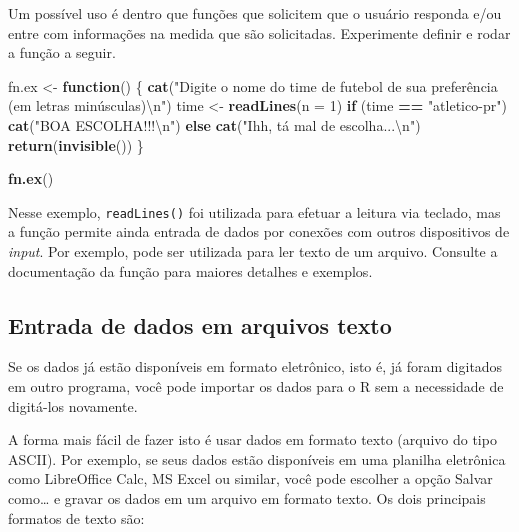 \documentclass[10pt,a4paper]{book}
\newenvironment{Shaded}{\begin{snugshade}}{\end{snugshade}}
\newcommand{\KeywordTok}[1]{\textcolor[rgb]{0.13,0.29,0.53}{\textbf{#1}}}
\newcommand{\DataTypeTok}[1]{\textcolor[rgb]{0.13,0.29,0.53}{#1}}
\newcommand{\DecValTok}[1]{\textcolor[rgb]{0.00,0.00,0.81}{#1}}
\newcommand{\CharTok}[1]{\textcolor[rgb]{0.31,0.60,0.02}{#1}}
\newcommand{\StringTok}[1]{\textcolor[rgb]{0.31,0.60,0.02}{#1}}
\newcommand{\ControlFlowTok}[1]{\textcolor[rgb]{0.13,0.29,0.53}{\textbf{#1}}}
\newcommand{\OperatorTok}[1]{\textcolor[rgb]{0.81,0.36,0.00}{\textbf{#1}}}
\newcommand{\NormalTok}[1]{#1}
\begin{document}
Um possível uso é dentro que funções que solicitem que o usuário
responda e/ou entre com informações na medida que são solicitadas.
Experimente definir e rodar a função a seguir.

\begin{Shaded}
\begin{Highlighting}[]
\NormalTok{fn.ex <-}\StringTok{ }\ControlFlowTok{function}\NormalTok{() \{}
    \KeywordTok{cat}\NormalTok{(}\StringTok{"Digite o nome do time de futebol de sua preferência (em letras minúsculas)}\CharTok{\textbackslash{}n}\StringTok{"}\NormalTok{)}
\NormalTok{    time <-}\StringTok{ }\KeywordTok{readLines}\NormalTok{(}\DataTypeTok{n =} \DecValTok{1}\NormalTok{)}
    \ControlFlowTok{if}\NormalTok{ (time }\OperatorTok{==}\StringTok{ "atletico-pr"}\NormalTok{)}
        \KeywordTok{cat}\NormalTok{(}\StringTok{"BOA ESCOLHA!!!}\CharTok{\textbackslash{}n}\StringTok{"}\NormalTok{)}
    \ControlFlowTok{else} \KeywordTok{cat}\NormalTok{(}\StringTok{"Ihh, tá mal de escolha...}\CharTok{\textbackslash{}n}\StringTok{"}\NormalTok{)}
    \KeywordTok{return}\NormalTok{(}\KeywordTok{invisible}\NormalTok{())}
\NormalTok{\}}
\end{Highlighting}
\end{Shaded}

\begin{Shaded}
\begin{Highlighting}[]
\KeywordTok{fn.ex}\NormalTok{()}
\end{Highlighting}
\end{Shaded}

Nesse exemplo, \texttt{readLines()} foi utilizada para efetuar a leitura
via teclado, mas a função permite ainda entrada de dados por conexões
com outros dispositivos de \emph{input}. Por exemplo, pode ser utilizada
para ler texto de um arquivo. Consulte a documentação da função para
maiores detalhes e exemplos.

\subsection{Entrada de dados em arquivos
texto}\label{entrada-de-dados-em-arquivos-texto}

Se os dados já estão disponíveis em formato eletrônico, isto é, já foram
digitados em outro programa, você pode importar os dados para o R sem a
necessidade de digitá-los novamente.

A forma mais fácil de fazer isto é usar dados em formato texto (arquivo
do tipo ASCII). Por exemplo, se seus dados estão disponíveis em uma
planilha eletrônica como LibreOffice Calc, MS Excel ou similar, você
pode escolher a opção Salvar como\ldots{} e gravar os dados em um
arquivo em formato texto. Os dois principais formatos de texto são:
\end{document}
